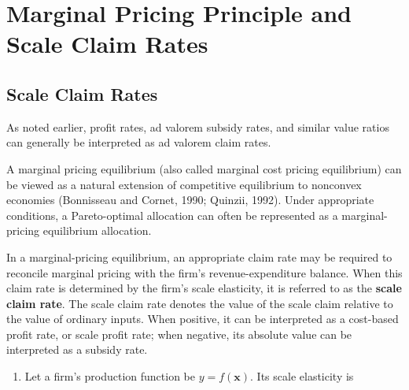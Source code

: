 \documentclass[
  letterpaper,
  DIV=11,
  numbers=noendperiod]{scrreprt}
\newenvironment{Shaded}{\begin{snugshade}}{\end{snugshade}}
\newcommand{\ConstantTok}[1]{\textcolor[rgb]{0.56,0.35,0.01}{#1}}
\newcommand{\FloatTok}[1]{\textcolor[rgb]{0.68,0.00,0.00}{#1}}
\newcommand{\FunctionTok}[1]{\textcolor[rgb]{0.28,0.35,0.67}{#1}}
\newcommand{\NormalTok}[1]{\textcolor[rgb]{0.00,0.23,0.31}{#1}}
\newcommand{\OperatorTok}[1]{\textcolor[rgb]{0.37,0.37,0.37}{#1}}
\providecommand{\tightlist}{%
  \setlength{\itemsep}{0pt}\setlength{\parskip}{0pt}}\usepackage{longtable,booktabs,array}
\begin{document}
%

\section{Marginal Pricing Principle and Scale Claim
Rates}\label{marginal-pricing-principle-and-scale-claim-rates}

\subsection{Scale Claim Rates}\label{scale-claim-rates}

As noted earlier, profit rates, ad valorem subsidy rates, and similar
value ratios can generally be interpreted as ad valorem claim rates.

A marginal pricing equilibrium (also called marginal cost pricing
equilibrium) can be viewed as a natural extension of competitive
equilibrium to nonconvex economies (Bonnisseau and Cornet, 1990;
Quinzii, 1992). Under appropriate conditions, a Pareto-optimal
allocation can often be represented as a marginal-pricing equilibrium
allocation.

In a marginal-pricing equilibrium, an appropriate claim rate may be
required to reconcile marginal pricing with the firm's
revenue-expenditure balance. When this claim rate is determined by the
firm's scale elasticity, it is referred to as the \textbf{scale claim
rate}. The scale claim rate denotes the value of the scale claim
relative to the value of ordinary inputs. When positive, it can be
interpreted as a cost-based profit rate, or scale profit rate; when
negative, its absolute value can be interpreted as a subsidy rate.

\begin{enumerate}
\def\labelenumi{\arabic{enumi}.}
\tightlist
\item
  Let a firm's production function be \(y=f(\mathbf x)\). Its scale
  elasticity is
\end{enumerate}
\end{document}
